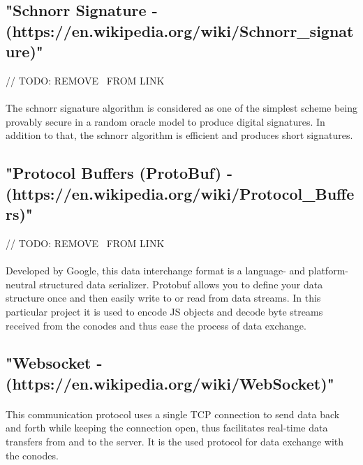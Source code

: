 \subsection{"Schnorr Signature - (https://en.wikipedia.org/wiki/Schnorr\_signature)"}

// TODO: REMOVE \ FROM LINK

\paragraph{}
The schnorr signature algorithm is considered as one of the simplest scheme being provably secure in a random oracle model to produce digital signatures. In addition to that, the schnorr algorithm is efficient and produces short signatures.

\subsection{"Protocol Buffers (ProtoBuf) - (https://en.wikipedia.org/wiki/Protocol\_Buffers)"}

// TODO: REMOVE \ FROM LINK

\paragraph{}
Developed by Google, this data interchange format is a language- and platform-neutral structured data serializer. Protobuf allows you to define your data structure once and then easily write to or read from data streams. In this particular project it is used to encode JS objects and decode byte streams received from the conodes and thus ease the process of data exchange.

\subsection{"Websocket - (https://en.wikipedia.org/wiki/WebSocket)"}

\paragraph{}
This communication protocol uses a single TCP connection to send data back and forth while keeping the connection open, thus facilitates real-time data transfers from and to the server. It is the used protocol for data exchange with the conodes.
